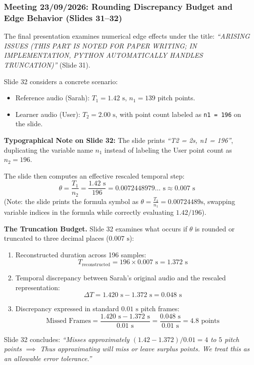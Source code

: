 \documentclass[11pt,a4paper]{article}
\begin{document}
\subsubsection*{Meeting 23/09/2026: Rounding Discrepancy Budget and Edge Behavior (Slides 31--32)}

The final presentation examines numerical edge effects under the title: \textit{``ARISING ISSUES (THIS PART IS NOTED FOR PAPER WRITING; IN IMPLEMENTATION, PYTHON AUTOMATICALLY HANDLES TRUNCATION)''} (Slide 31).

Slide 32 considers a concrete scenario:
\begin{itemize}
    \item Reference audio (Sarah): $T_1 = 1.42\text{ s}$, $n_1 = 139$ pitch points.
    \item Learner audio (User): $T_2 = 2.00\text{ s}$, with point count labeled as \texttt{n1 = 196} on the slide.
\end{itemize}
\textbf{Typographical Note on Slide 32:} The slide prints \textit{``T2 = 2s, n1 = 196''}, duplicating the variable name $n_1$ instead of labeling the User point count as $n_2 = 196$.

The slide then computes an effective rescaled temporal step:
\begin{equation}
\theta = \frac{T_1}{n_2} = \frac{1.42\text{ s}}{196} = 0.0072448979\dots\text{ s} \approx 0.007\text{ s}
\end{equation}
(Note: the slide prints the formula symbol as $\theta = \frac{T_2}{n_1} = 0.00724489\text{s}$, swapping variable indices in the formula while correctly evaluating $1.42 / 196$).

\textbf{The Truncation Budget.} Slide 32 examines what occurs if $\theta$ is rounded or truncated to three decimal places ($0.007\text{ s}$):
\begin{enumerate}
    \item Reconstructed duration across 196 samples:
    \begin{equation}
    T_{\text{reconstructed}} = 196 \times 0.007\text{ s} = 1.372\text{ s}
    \end{equation}
    \item Temporal discrepancy between Sarah's original audio and the rescaled representation:
    \begin{equation}
    \Delta T = 1.420\text{ s} - 1.372\text{ s} = 0.048\text{ s}
    \end{equation}
    \item Discrepancy expressed in standard $0.01\text{ s}$ pitch frames:
    \begin{equation}
    \text{Missed Frames} = \frac{1.420\text{ s} - 1.372\text{ s}}{0.01\text{ s}} = \frac{0.048\text{ s}}{0.01\text{ s}} = 4.8\text{ points}
    \end{equation}
\end{enumerate}
Slide 32 concludes: \textit{``Misses approximately $(1.42 - 1.372) / 0.01 = 4$ to $5$ pitch points $\implies$ Thus approximating will miss or leave surplus points. We treat this as an allowable error tolerance.''}
\end{document}
